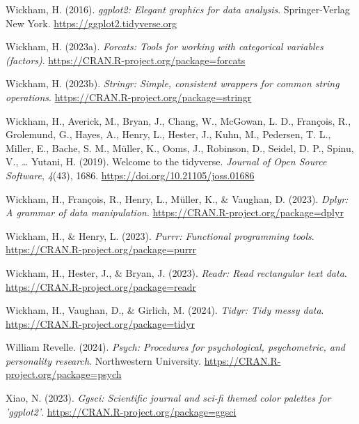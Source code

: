 \documentclass[
  man,floatsintext]{apa7}
\newlength{\cslhangindent}
\newlength{\cslentryspacingunit} %
\newenvironment{CSLReferences}[2] %
 {%
  \setlength{\parindent}{0pt}
  \ifodd #1
  \let\oldpar\par
  \def\par{\hangindent=\cslhangindent\oldpar}
  \fi
  \setlength{\parskip}{#2\cslentryspacingunit}
 }%
 {}
\begin{document}
\begin{CSLReferences}{1}{0}
\leavevmode{}%
Wickham, H. (2016). \emph{ggplot2: Elegant graphics for data analysis}. Springer-Verlag New York. \url{https://ggplot2.tidyverse.org}

\leavevmode{}%
Wickham, H. (2023a). \emph{Forcats: Tools for working with categorical variables (factors)}. \url{https://CRAN.R-project.org/package=forcats}

\leavevmode{}%
Wickham, H. (2023b). \emph{Stringr: Simple, consistent wrappers for common string operations}. \url{https://CRAN.R-project.org/package=stringr}

\leavevmode{}%
Wickham, H., Averick, M., Bryan, J., Chang, W., McGowan, L. D., François, R., Grolemund, G., Hayes, A., Henry, L., Hester, J., Kuhn, M., Pedersen, T. L., Miller, E., Bache, S. M., Müller, K., Ooms, J., Robinson, D., Seidel, D. P., Spinu, V., \ldots{} Yutani, H. (2019). Welcome to the {tidyverse}. \emph{Journal of Open Source Software}, \emph{4}(43), 1686. \url{https://doi.org/10.21105/joss.01686}

\leavevmode{}%
Wickham, H., François, R., Henry, L., Müller, K., \& Vaughan, D. (2023). \emph{Dplyr: A grammar of data manipulation}. \url{https://CRAN.R-project.org/package=dplyr}

\leavevmode{}%
Wickham, H., \& Henry, L. (2023). \emph{Purrr: Functional programming tools}. \url{https://CRAN.R-project.org/package=purrr}

\leavevmode{}%
Wickham, H., Hester, J., \& Bryan, J. (2023). \emph{Readr: Read rectangular text data}. \url{https://CRAN.R-project.org/package=readr}

\leavevmode{}%
Wickham, H., Vaughan, D., \& Girlich, M. (2024). \emph{Tidyr: Tidy messy data}. \url{https://CRAN.R-project.org/package=tidyr}

\leavevmode{}%
William Revelle. (2024). \emph{Psych: Procedures for psychological, psychometric, and personality research}. Northwestern University. \url{https://CRAN.R-project.org/package=psych}

\leavevmode{}%
Xiao, N. (2023). \emph{Ggsci: Scientific journal and sci-fi themed color palettes for 'ggplot2'}. \url{https://CRAN.R-project.org/package=ggsci}


\end{CSLReferences}
\end{document}
